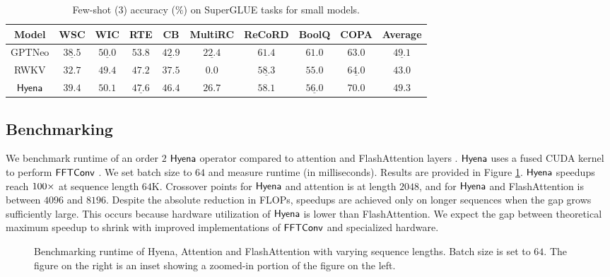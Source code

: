 \begin{table}[!h]
\small
\centering
\caption{Few-shot ($3$) accuracy ($\%$) on {\sc SuperGLUE} tasks for small models.}
\label{supergluefew}
\vspace{2mm}
\setlength{\tabcolsep}{4pt}
\begin{tabular}{@{}c|ccccccccc@{}}
\toprule
Model &\multicolumn{1}{c}{{\sc WSC}} & \multicolumn{1}{c}{{\sc WIC}} & \multicolumn{1}{c}{{\sc RTE}} & \multicolumn{1}{c}{{\sc CB}} & \multicolumn{1}{c}{{\sc MultiRC}} &  \multicolumn{1}{c}{{\sc ReCoRD}} &  \multicolumn{1}{c}{{\sc BoolQ}} &  \multicolumn{1}{c}{{\sc COPA}} & \multicolumn{1}{c}{{\sc Average}} \\
\midrule 
GPTNeo \citep{gpt-neo} & $\underline{38.5}$ & $\underline{50.0}$ & $\mathbf{53.8}$ & $\underline{42.9}$ & $\underline{22.4}$ & $\mathbf{61.4}$ & $\mathbf{61.0}$ & $63.0$ & $\underline{49.1}$ \\ 
RWKV \citep{PENG_RWKV-LM_2021} & $32.7$ & $49.4$ & $47.2$ & $37.5$ & $0.0$ & $\underline{58.3}$ & $55.0$ & $\underline{64.0}$ & $43.0$ \\
${\sf Hyena}$ & $\mathbf{39.4}$ & $\mathbf{50.1}$ & $\underline{47.6}$ & $\mathbf{46.4}$ & $\mathbf{26.7}$ & $58.1$ & $\underline{56.0}$ & $\mathbf{70.0}$ & $\mathbf{49.3}$ \\
\bottomrule
\end{tabular}
\end{table}
%

%
\subsection{Benchmarking}
%
We benchmark runtime of an order $2$ ${\sf Hyena}$ operator compared to attention and FlashAttention layers \citep{dao2022flashattention}. ${\sf Hyena}$ uses a fused CUDA kernel to perform ${\sf FFTConv}$ \citep{dao2022hungry}. We set batch size to $64$ and measure runtime (in milliseconds). Results are provided in Figure \ref{fig:benchmarking_plot}. ${\sf Hyena}$ speedups reach $100\times$ at sequence length $64$K. Crossover points for ${\sf Hyena}$ and attention is at length $2048$, and for ${\sf Hyena}$ and FlashAttention is between $4096$ and $8196$. Despite the absolute reduction in FLOPs, speedups are achieved only on longer sequences when the gap grows sufficiently large. This occurs because hardware utilization of ${\sf Hyena}$ is lower than FlashAttention. We expect the gap between theoretical maximum speedup to shrink with improved implementations of ${\sf FFTConv}$ and specialized hardware.
%
\begin{figure}[t]
    \centering
    
    \vspace{-5mm}
    \caption{Benchmarking runtime of Hyena, Attention and FlashAttention with varying sequence lengths. Batch size is set to $64$. The figure on the right is an inset showing a zoomed-in portion of the figure on the left.}
    \label{fig:benchmarking_plot}
\end{figure}

